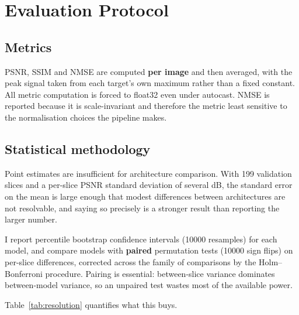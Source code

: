 \documentclass[11pt]{article}
\begin{document}
\section{Evaluation Protocol}
\label{sec:evaluation}

\subsection{Metrics}
\label{sec:metrics}

PSNR, SSIM and NMSE are computed \textbf{per image} and then averaged, with the
peak signal taken from each target's own maximum rather than a fixed constant.
All metric computation is forced to float32 even under autocast. NMSE is
reported because it is scale-invariant and therefore the metric least sensitive
to the normalisation choices the pipeline makes.

\subsection{Statistical methodology}

Point estimates are insufficient for architecture comparison. With 199
validation slices and a per-slice PSNR standard deviation of several dB, the
standard error on the mean is large enough that modest differences between
architectures are not resolvable, and saying so precisely is a stronger result
than reporting the larger number.

I report percentile bootstrap confidence intervals (\num{10000} resamples) for
each model, and compare models with \textbf{paired} permutation tests
(\num{10000} sign flips) on per-slice differences, corrected across the family
of comparisons by the Holm--Bonferroni procedure. Pairing is essential:
between-slice variance dominates between-model variance, so an unpaired test
wastes most of the available power.

Table~\ref{tab:resolution} quantifies what this buys.
\end{document}
